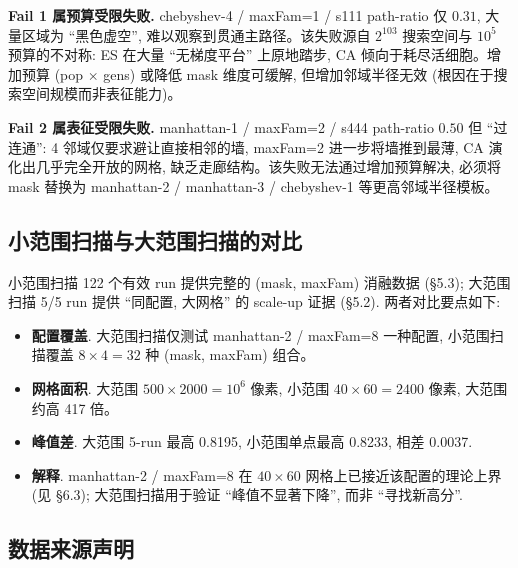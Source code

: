 \noindent\textbf{Fail 1 属预算受限失败.} chebyshev-4 / maxFam=1 / s111 path-ratio 仅 $0.31$, 大量区域为 ``黑色虚空'', 难以观察到贯通主路径。该失败源自 $2^{103}$ 搜索空间与 $10^5$ 预算的不对称: ES 在大量 ``无梯度平台'' 上原地踏步, CA 倾向于耗尽活细胞。增加预算 (pop $\times$ gens) 或降低 mask 维度可缓解, 但增加邻域半径无效 (根因在于搜索空间规模而非表征能力)。

\noindent\textbf{Fail 2 属表征受限失败.} manhattan-1 / maxFam=2 / s444 path-ratio $0.50$ 但 ``过连通'': 4 邻域仅要求避让直接相邻的墙, maxFam=2 进一步将墙推到最薄, CA 演化出几乎完全开放的网格, 缺乏走廊结构。该失败无法通过增加预算解决, 必须将 mask 替换为 manhattan-2 / manhattan-3 / chebyshev-1 等更高邻域半径模板。

\subsection{小范围扫描与大范围扫描的对比}

小范围扫描 122 个有效 run 提供完整的 (mask, maxFam) 消融数据 (§5.3); 大范围扫描 5/5 run 提供 ``同配置, 大网格'' 的 scale-up 证据 (§5.2). 两者对比要点如下:
\begin{itemize}[leftmargin=*, itemsep=0pt, topsep=0pt]
  \item \textbf{配置覆盖}. 大范围扫描仅测试 manhattan-2 / maxFam=8 一种配置, 小范围扫描覆盖 $8 \times 4 = 32$ 种 (mask, maxFam) 组合。
  \item \textbf{网格面积}. 大范围 $500 \times 2000 = 10^6$ 像素, 小范围 $40 \times 60 = 2400$ 像素, 大范围约高 417 倍。
  \item \textbf{峰值差}. 大范围 5-run 最高 0.8195, 小范围单点最高 0.8233, 相差 0.0037.
  \item \textbf{解释}. manhattan-2 / maxFam=8 在 $40 \times 60$ 网格上已接近该配置的理论上界 (见 §6.3); 大范围扫描用于验证 ``峰值不显著下降'', 而非 ``寻找新高分''.
\end{itemize}

\subsection{数据来源声明}

